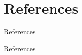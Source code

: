 \documentclass[handout,10pt]{beamer}
\begin{document}

\section{References}
\begin{frame}{}
\Large
\vfill
\begin{center}
    References
\end{center}
\vfill

\end{frame}

\begin{frame}[allowframebreaks]{References}
\footnotesize
\printbibliography
\end{frame}
\end{document}
